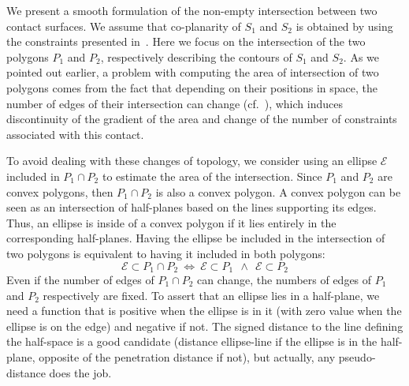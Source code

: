 We present a smooth formulation of the non-empty intersection between two contact surfaces.
We assume that co-planarity of $S_1$ and $S_2$ is obtained by using the constraints presented in~.
Here we focus on the intersection of the two polygons $P_1$ and $P_2$, respectively describing the contours of $S_1$ and $S_2$.
As we pointed out earlier, a problem with computing the area of intersection of two polygons comes from the fact that depending on their positions in space, the number of edges of their intersection can change (cf.~), which induces discontinuity of the gradient of the area and change of the number of constraints associated with this contact.

To avoid dealing with these changes of topology, we consider using an ellipse $\mathcal{E}$ included in $P_1 \cap P_2$ to estimate the area of the intersection.
Since $P_1$ and $P_2$ are convex polygons, then $P_1 \cap P_2$ is also a convex polygon.
A convex polygon can be seen as an intersection of half-planes based on the lines supporting its edges.
Thus, an ellipse is inside of a convex polygon if it lies entirely in the corresponding half-planes.
Having the ellipse be included in the intersection of two polygons is equivalent to having it included in both polygons:
\begin{equation}
\mathcal{E} \subset P_1 \cap P_2 \ \Longleftrightarrow \
\mathcal{E} \subset P_1 \ \ \wedge \ \  \mathcal{E} \subset P_2
\end{equation}
Even if the number of edges of $P_1 \cap P_2$ can change, the numbers of edges of $P_1$ and $P_2$ respectively are fixed.
To assert that an ellipse lies in a half-plane, we need a function that is positive when the ellipse is in it (with zero value when the ellipse is on the edge) and negative if not.
The signed distance to the line defining the half-space is a good candidate (distance ellipse-line if the ellipse is in the half-plane, opposite of the penetration distance if not), but actually, any pseudo-distance does the job.
